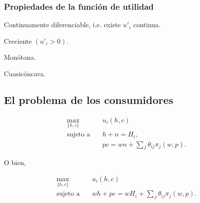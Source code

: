 \documentclass[8pt,a4paper]{extarticle}
\begin{document}
\begin{multicols}{3}
\subsubsection*{Propiedades de la función de utilidad}

\begin{eqlist}
\item Continuamente diferenciable, i.e. existe $u'_i$ continua.
\item Creciente $(u'_i > 0)$.
\item Monótona.
\item Cuasicóncava.
\end{eqlist}

\subsection{El problema de los consumidores}

\begin{equation*}
\begin{aligned}
	\max_{\{h, c\}}\	  & u_i(h, c) \\
	\text{sujeto a} \quad & h + n = H_i, \\
						  & pc = wn + \sum_J \theta_{ij} \pi_j (w, p).
\end{aligned}
\end{equation*}

O bien,

\begin{equation*}
\begin{aligned}
	\max_{\{h, c\}}\	  & u_i(h, c) \\
	\text{sujeto a} \quad & wh + pc = wH_i + \sum_J \theta_{ij} \pi_j (w, p).
\end{aligned}
\end{equation*}


\end{multicols}
\end{document}
